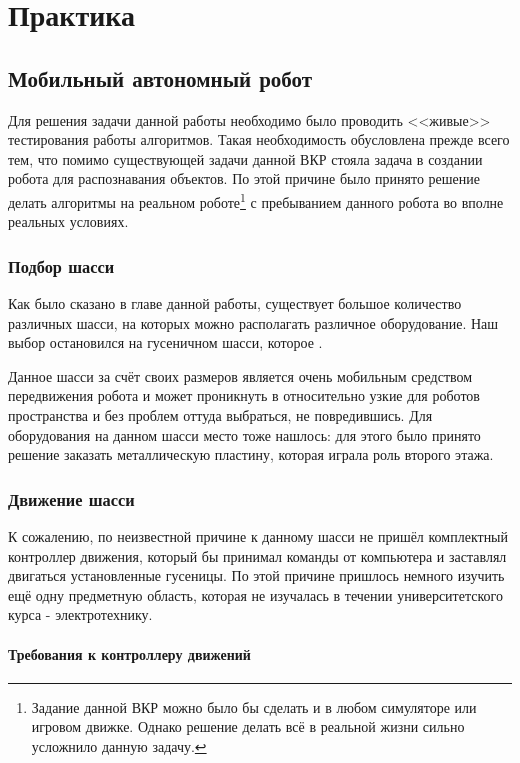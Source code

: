 \chapter{Практика}\label{ch:ch3}

\section{Мобильный автономный робот}
Для решения задачи данной работы необходимо было проводить <<живые>> тестирования работы алгоритмов. Такая необходимость обусловлена прежде всего тем, что помимо существующей задачи данной ВКР стояла задача в создании робота для распознавания объектов. По этой причине было принято решение делать алгоритмы на реальном роботе\footnote{Задание данной ВКР можно было бы сделать и в любом симуляторе или игровом движке. Однако решение делать всё в реальной жизни сильно усложнило данную задачу.} с пребыванием данного робота во вполне реальных условиях.

\subsection{Подбор шасси}
Как было сказано в  главе данной работы, существует большое количество различных шасси, на которых можно располагать различное оборудование. Наш выбор остановился на гусеничном шасси, которое .

Данное шасси за счёт своих размеров является очень мобильным средством передвижения робота и может проникнуть в относительно узкие для роботов пространства и без проблем оттуда выбраться, не повредившись. Для оборудования на данном шасси место тоже нашлось: для этого было принято решение заказать металлическую пластину, которая играла роль второго этажа. 

\subsection{Движение шасси}

К сожалению, по неизвестной причине к данному шасси не пришёл комплектный контроллер движения, который бы принимал команды от компьютера и заставлял двигаться установленные гусеницы. По этой причине пришлось немного изучить ещё одну предметную область, которая не изучалась в течении университетского курса - электротехнику. 

\subsubsection{Требования к контроллеру движений}

